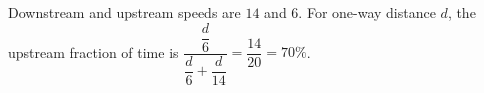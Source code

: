 Downstream and upstream speeds are $14$ and $6$. For one-way distance $d$, the upstream fraction of time is $\dfrac{\dfrac{d}{6}}{\dfrac{d}{6}+\dfrac{d}{14}}=\dfrac{14}{20}=\boxed{70\%}$.
